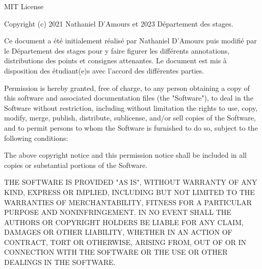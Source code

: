 MIT License

Copyright (c) 2021 Nathaniel D'Amours et 2023 Département des stages.

Ce document a été initialement réalisé par Nathaniel D'Amours puis modifié par le Département des stages pour y faire figurer les différents annotations, distributions des points et consignes attenantes. Le document est mis à disposition des étudiant(e)s avec l'accord des différentes parties.

Permission is hereby granted, free of charge, to any person obtaining a copy
of this software and associated documentation files (the "Software"), to deal
in the Software without restriction, including without limitation the rights
to use, copy, modify, merge, publish, distribute, sublicense, and/or sell
copies of the Software, and to permit persons to whom the Software is
furnished to do so, subject to the following conditions:

The above copyright notice and this permission notice shall be included in all
copies or substantial portions of the Software.

THE SOFTWARE IS PROVIDED "AS IS", WITHOUT WARRANTY OF ANY KIND, EXPRESS OR
IMPLIED, INCLUDING BUT NOT LIMITED TO THE WARRANTIES OF MERCHANTABILITY,
FITNESS FOR A PARTICULAR PURPOSE AND NONINFRINGEMENT. IN NO EVENT SHALL THE
AUTHORS OR COPYRIGHT HOLDERS BE LIABLE FOR ANY CLAIM, DAMAGES OR OTHER
LIABILITY, WHETHER IN AN ACTION OF CONTRACT, TORT OR OTHERWISE, ARISING FROM,
OUT OF OR IN CONNECTION WITH THE SOFTWARE OR THE USE OR OTHER DEALINGS IN THE
SOFTWARE.